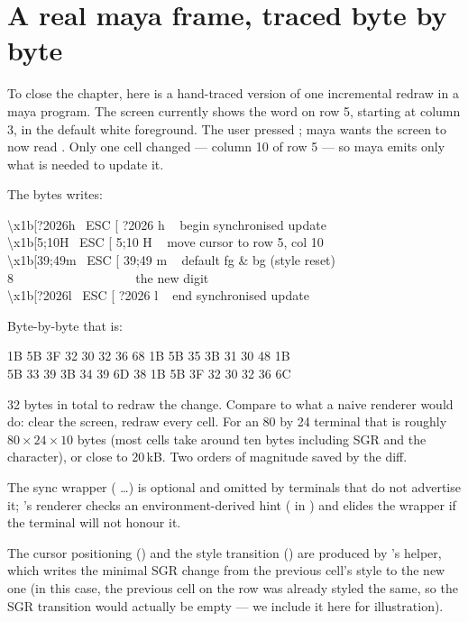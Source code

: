\section{A real maya frame, traced byte by byte}
\label{sec:term:trace}

To close the chapter, here is a hand-traced version of one
incremental redraw in a maya program. The screen currently shows
the word  on row 5, starting at column 3, in the
default white foreground. The user pressed \code{+}; maya wants the
screen to now read . Only one cell changed --- column
10 of row 5 --- so maya emits only what is needed to update it.

The bytes \maya{} writes:

\begin{terminalbox}
\textbackslash x1b[?2026h   ~ESC [ ?2026 h ~  begin synchronised update \\
\textbackslash x1b[5;10H   ~ESC [ 5;10 H  ~  move cursor to row 5, col 10 \\
\textbackslash x1b[39;49m  ~ESC [ 39;49 m ~  default fg \& bg (style reset) \\
8                       ~~~~~~~~~~~~~~~~~~  the new digit \\
\textbackslash x1b[?2026l  ~ESC [ ?2026 l ~  end synchronised update
\end{terminalbox}

Byte-by-byte that is:

\begin{terminalbox}
1B 5B 3F 32 30 32 36 68 1B 5B 35 3B 31 30 48 1B \\
5B 33 39 3B 34 39 6D 38 1B 5B 3F 32 30 32 36 6C
\end{terminalbox}

32 bytes in total to redraw the change. Compare to what a naive
renderer would do: clear the screen, redraw every cell. For an 80
by 24 terminal that is roughly $80 \times 24 \times 10$ bytes (most
cells take around ten bytes including SGR and the character), or
close to 20\,kB. Two orders of magnitude saved by the diff.

The sync wrapper ( \dots {}) is optional
and omitted by terminals that do not advertise it; \maya{}'s
renderer checks an environment-derived hint
( in
) and elides the wrapper if the terminal
will not honour it.

The cursor positioning (\code{ESC [ 5;10 H}) and the style transition
(\code{ESC [ 39;49 m}) are produced by \maya{}'s
 helper, which writes the minimal
SGR change from the previous cell's style to the new one (in this
case, the previous cell on the row was already styled the same, so
the SGR transition would actually be empty --- we include it here
for illustration).

